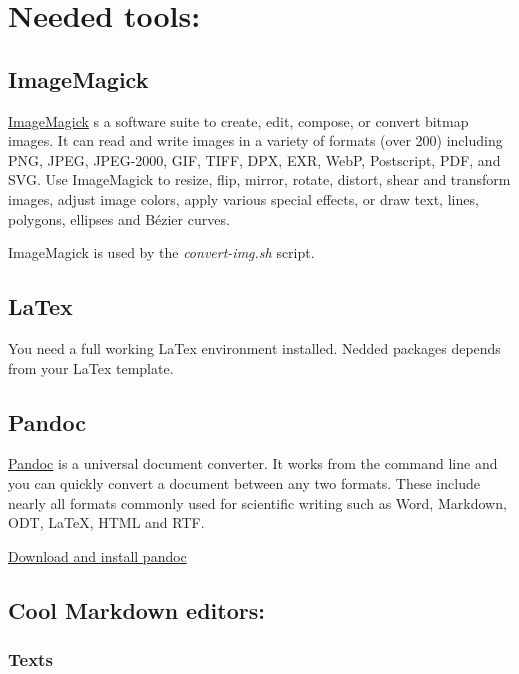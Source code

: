 \documentclass[	DIV=calc,%
							paper=a4,%
							fontsize=10pt]{scrartcl}	 					%
\begin{document}
\section{Needed tools:}\label{needed-tools}

\subsection{ImageMagick}\label{imagemagick}

\href{http://www.imagemagick.org/}{ImageMagick} s a software suite to
create, edit, compose, or convert bitmap images. It can read and write
images in a variety of formats (over 200) including PNG, JPEG,
JPEG-2000, GIF, TIFF, DPX, EXR, WebP, Postscript, PDF, and SVG. Use
ImageMagick to resize, flip, mirror, rotate, distort, shear and
transform images, adjust image colors, apply various special effects, or
draw text, lines, polygons, ellipses and Bézier curves.

ImageMagick is used by the \emph{convert-img.sh} script.

\subsection{LaTex}\label{latex}

You need a full working LaTex environment installed. Nedded packages
depends from your LaTex template.

\subsection{Pandoc}\label{pandoc}

\href{http://johnmacfarlane.net/pandoc/}{Pandoc} is a universal document
converter. It works from the command line and you can quickly convert a
document between any two formats. These include nearly all formats
commonly used for scientific writing such as Word, Markdown, ODT, LaTeX,
HTML and RTF.

\href{http://johnmacfarlane.net/pandoc/installing.html}{Download and
install pandoc}

\subsection{Cool Markdown editors:}\label{cool-markdown-editors}

\subsubsection{Texts}\label{texts}
\end{document}
